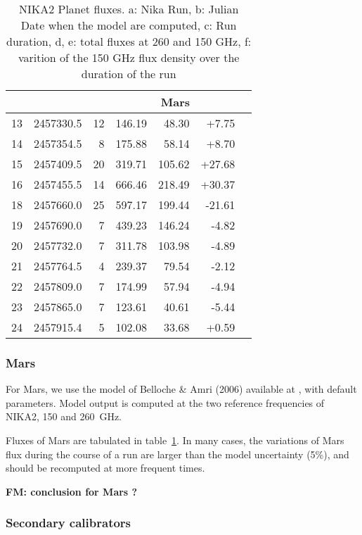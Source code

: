 \begin{table}[p]
\begin{tabular}{|l|r|r|r|r|r|r|}
\hline
         &    &            & \multicolumn{3}{|c|}{Mars}\\
\hline
13 & 2457330.5 &  12 & 146.19 & 48.30 & +7.75\\
14 & 2457354.5 &  8 & 175.88 & 58.14 & +8.70\\
15 & 2457409.5 &  20 & 319.71 & 105.62 & +27.68\\
16 & 2457455.5 &  14 & 666.46 & 218.49 & +30.37\\
18 & 2457660.0 &  25 & 597.17 & 199.44 & -21.61\\
19 & 2457690.0 &  7 & 439.23 & 146.24 & -4.82\\
20 & 2457732.0 &  7 & 311.78 & 103.98 & -4.89\\
21 & 2457764.5 &  4 & 239.37 & 79.54 & -2.12\\
22 & 2457809.0 &  7 & 174.99 & 57.94 & -4.94\\
23 & 2457865.0 &  7 & 123.61 & 40.61 & -5.44\\
24 & 2457915.4 &  5 & 102.08 & 33.68 & +0.59 \\
\hline
\end{tabular}
\caption{NIKA2 Planet fluxes. a: Nika Run, b: Julian Date when the
  model are computed, c: Run duration, d, e: total fluxes at 260 and
  150 GHz, f: varition of the 150 GHz flux density over the duration
  of the run}
\label{tab:fluxPred}
\end{table}


\subsubsection{Mars}
For Mars, we use the model of Belloche \&  Amri (2006) available at
\cite{beloche},
with default parameters. Model output is computed at the two reference
frequencies of NIKA2, 150 and 260~GHz.

Fluxes of Mars are tabulated in table~\ref{tab:fluxPred}. In many
cases, the variations of Mars flux during the course of a run are
larger than the model uncertainty (5\%), and should be recomputed at
more frequent times. 


{\bf FM: conclusion for Mars ?}\\



\subsubsection{Secondary calibrators}

